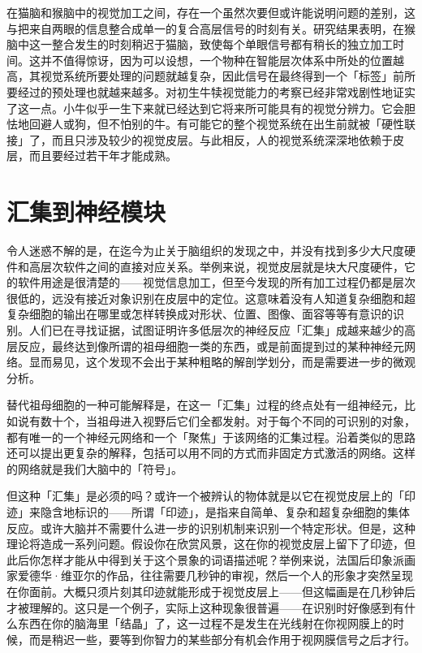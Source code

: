 \documentclass[
  12pt,
  twoside,
  openright,
  oldfontcommands,
]{memoir}
\begin{document}
在猫脑和猴脑中的视觉加工之间，存在一个虽然次要但或许能说明问题的差别，这与把来自两眼的信息整合成单一的复合高层信号的时刻有关。研究结果表明，在猴脑中这一整合发生的时刻稍迟于猫脑，致使每个单眼信号都有稍长的独立加工时间。这并不值得惊讶，因为可以设想，一个物种在智能层次体系中所处的位置越高，其视觉系统所要处理的问题就越复杂，因此信号在最终得到一个「标签」前所要经过的预处理也就越来越多。对初生牛犊视觉能力的考察已经非常戏剧性地证实了这一点。小牛似乎一生下来就已经达到它将来所可能具有的视觉分辨力。它会胆怯地回避人或狗，但不怕别的牛。有可能它的整个视觉系统在出生前就被「硬性联接」了，而且只涉及较少的视觉皮层。与此相反，人的视觉系统深深地依赖于皮层，而且要经过若干年才能成熟。

\section{汇集到神经模块}

令人迷惑不解的是，在迄今为止关于脑组织的发现之中，并没有找到多少大尺度硬件和高层次软件之间的直接对应关系。举例来说，视觉皮层就是块大尺度硬件，它的软件用途是很清楚的------视觉信息加工，但至今发现的所有加工过程仍都是层次很低的，远没有接近对象识别在皮层中的定位。这意味着没有人知道复杂细胞和超复杂细胞的输出在哪里或怎样转换成对形状、位置、图像、面容等等有意识的识别。人们已在寻找证据，试图证明许多低层次的神经反应「汇集」成越来越少的高层反应，最终达到像所谓的祖母细胞一类的东西，或是前面提到过的某种神经元网络。显而易见，这个发现不会出于某种粗略的解剖学划分，而是需要进一步的微观分析。

替代祖母细胞的一种可能解释是，在这一「汇集」过程的终点处有一组神经元，比如说有数十个，当祖母进入视野后它们全都发射。对于每个不同的可识别的对象，都有唯一的一个神经元网络和一个「聚焦」于该网络的汇集过程。沿着类似的思路还可以提出更复杂的解释，包括可以用不同的方式而非固定方式激活的网络。这样的网络就是我们大脑中的「符号」。

但这种「汇集」是必须的吗？或许一个被辨认的物体就是以它在视觉皮层上的「印迹」来隐含地标识的------所谓「印迹」，是指来自简单、复杂和超复杂细胞的集体反应。或许大脑并不需要什么进一步的识别机制来识别一个特定形状。但是，这种理论将造成一系列问题。假设你在欣赏风景，这在你的视觉皮层上留下了印迹，但此后你怎样才能从中得到关于这个景象的词语描述呢？举例来说，法国后印象派画家爱德华·维亚尔的作品，往往需要几秒钟的审视，然后一个人的形象才突然呈现在你面前。大概只须片刻其印迹就能形成于视觉皮层上------但这幅画是在几秒钟后才被理解的。这只是一个例子，实际上这种现象很普遍------在识别时好像感到有什么东西在你的脑海里「结晶」了，这一过程不是发生在光线射在你视网膜上的时候，而是稍迟一些，要等到你智力的某些部分有机会作用于视网膜信号之后才行。
\end{document}
